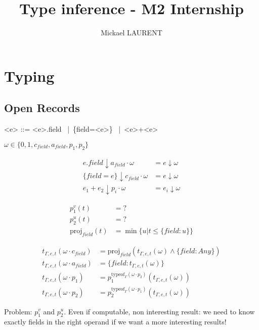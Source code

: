 \documentclass[a4paper]{article}%
\title{\vspace{1.5cm}Type inference - M2 Internship}
\author{Mickael LAURENT}
\date{\vspace{-5ex}}
\newcommand{\alt}{~|~}
\begin{document}
	\maketitle

    \section{Typing}

    \subsection{Open Records}

    \begin{grammar}
        \let\syntleft\relax
        \let\syntright\relax
        <e> ::= <e>.field \alt \{field=<e>\} \alt <e>+<e>
    \end{grammar}

    $ \omega \in \{0,1,c_{field},a_{field},p_1,p_2\} $

    \begin{align*} 
        e.field \downarrow a_{field}\cdot\omega & = e \downarrow \omega\\
        \{field=e\} \downarrow c_{field}\cdot\omega & = e \downarrow \omega\\
        e_1 + e_2 \downarrow p_i \cdot \omega & = e_i \downarrow \omega
    \end{align*}

    \begin{align*}
        p_1^v(t) &= ?\\
        p_2^u(t) &= ?\\
        \text{proj}_{field}(t) &= \min\{u | t \leq \{field:u\}\}
    \end{align*}

    \begin{align*}
        t_{\Gamma,e,t}(\omega\cdot c_{field}) &= \text{proj}_{field}(t_{\Gamma,e,t}(\omega) \land \{field:Any\})\\
        t_{\Gamma,e,t}(\omega\cdot a_{field}) &= \{ field: t_{\Gamma,e,t}(\omega) \}\\
        t_{\Gamma,e,t}(\omega\cdot p_1) &=  p_1^{\text{typeof}_{\Gamma}(\omega\cdot p_2)}(t_{\Gamma,e,t}(\omega))\\
        t_{\Gamma,e,t}(\omega\cdot p_2) &=  p_2^{\text{typeof}_{\Gamma}(\omega\cdot p_1)}(t_{\Gamma,e,t}(\omega))
    \end{align*}

    Problem: $p_1^v$ and $p_2^u$. Even if computable, non interesting result: we need to know exactly fields in the right operand
    if we want a more interesting results!
\end{document}
